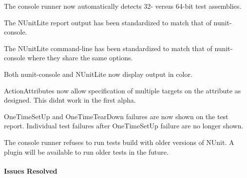 \begin{DoxyItemize}
\item The console runner now automatically detects 32-\/ versus 64-\/bit test assemblies.
\item The N\+Unit\+Lite report output has been standardized to match that of nunit-\/console.
\item The N\+Unit\+Lite command-\/line has been standardized to match that of nunit-\/console where they share the same options.
\item Both nunit-\/console and N\+Unit\+Lite now display output in color.
\item Action\+Attributes now allow specification of multiple targets on the attribute as designed. This didn\textquotesingle{}t work in the first alpha.
\item One\+Time\+Set\+Up and One\+Time\+Tear\+Down failures are now shown on the test report. Individual test failures after One\+Time\+Set\+Up failure are no longer shown.
\item The console runner refuses to run tests build with older versions of N\+Unit. A plugin will be available to run older tests in the future.
\end{DoxyItemize}

\paragraph*{Issues Resolved}


